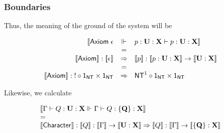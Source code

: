 \subsubsection{Boundaries}


Thus, the meaning of the ground of the system will be

$$\begin{array}{rcl}
  \ldb \mathsf{Axiom}\; \epsilon & \Vdash & p : \mathbf{U} : \mathbf {X} \vdash p : \mathbf{U} : \mathbf {X} \rdb \\
  & = & \\
  \meaningof{\mathsf{Axiom}} : \meaningof{\epsilon} & \Rightarrow & \meaningof{p} : \meaningof{p : \mathbf{U : X}} \to \meaningof{\mathbf{U : X}} \\
 & = & \\
  \meaningof{\mathsf{Axiom}} : \mathsf{!} \circ \mathsf{1}_{\mathsf{NT}} \times \mathsf{1}_{\mathsf{NT}} & \Rightarrow & \mathsf{NT}^{1} \circ \mathsf{1}_{\mathsf{NT}} \times \mathsf{1}_{\mathsf{NT}} \\
\end{array}$$

Likewise, we calculate

$$\begin{array}{l}
  \meaningof{\Gamma \vdash Q : \mathbf{U} : \mathbf {X} \Vdash \Gamma \vdash Q : \mathbf{\{ Q \}} : \mathbf {X}} \\
  = \\
  \meaningof{\mathsf{Character}} : \meaningof{Q} : \meaningof{\Gamma} \to \meaningof{\mathbf{U} : \mathbf{X}} \Rightarrow \meaningof{Q} : \meaningof{\Gamma} \to \meaningof{\mathbf{\{ Q \}} : \mathbf {X}}
\end{array}$$

